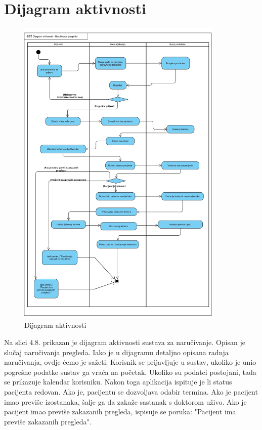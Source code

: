 			
			\eject 
		\section{Dijagram aktivnosti}
  
			 \begin{figure}[H]         %
			            \includegraphics[width=0.88\textwidth]  {slike/dijagram_aktivnosti_v2.jpg} %
			          \caption{Dijagram aktivnosti}
			            \label{fig:act} %
		      \end{figure}
                 \texttt{}{
                 Na slici 4.8. prikazan je dijagram aktivnosti sustava za naručivanje. Opisan je slučaj naručivanja pregleda. Iako je u dijagramu detaljno opisana radnja naručivanja, ovdje ćemo je sažeti. Korisnik se prijavljuje u sustav, ukoliko je unio pogrešne podatke sustav ga vraća na početak. Ukoliko su podatci postojani, tada se prikazuje kalendar korisniku. Nakon toga aplikacija ispituje je li status pacijenta redovan. Ako je, pacijentu se dozvoljava odabir termina. Ako je pacijent imao previše izostanaka, šalje ga da zakaže sastanak s doktorom uživo. Ako je pacijent imao previše zakazanih pregleda, ispisuje se poruka: "Pacijent ima previše zakazanih pregleda".
                 }
			
